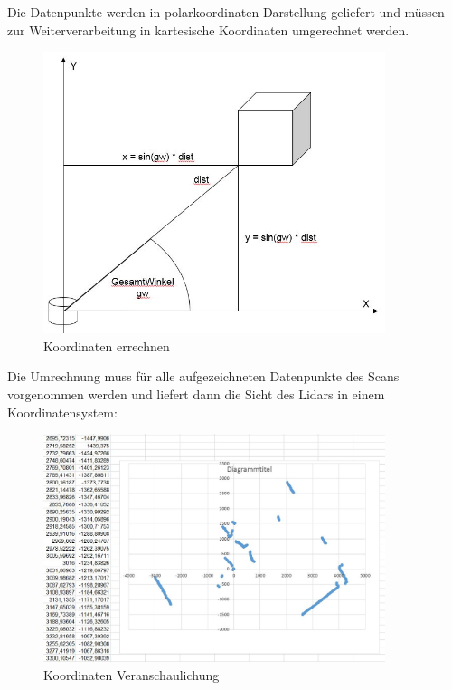 Die Datenpunkte werden in polarkoordinaten Darstellung geliefert und müssen zur Weiterverarbeitung in kartesische Koordinaten umgerechnet werden. 

\begin{figure}[h]
\begin{center}
\includegraphics[width=10cm]{images/chapter6/LidarKoordRechnung.JPG}
\caption{Koordinaten errechnen}
\label{Koordinaten_errechnen}
\end{center}
\end{figure}

Die Umrechnung muss für alle aufgezeichneten Datenpunkte des Scans vorgenommen werden und liefert dann die Sicht des Lidars in einem Koordinatensystem:

\begin{figure}[h]
\begin{center}
\includegraphics[width=10cm]{images/chapter6/kartKoord.JPG}
\caption{Koordinaten Veranschaulichung}
\label{Koordinaten_veranschaulichung}
\end{center}
\end{figure}




